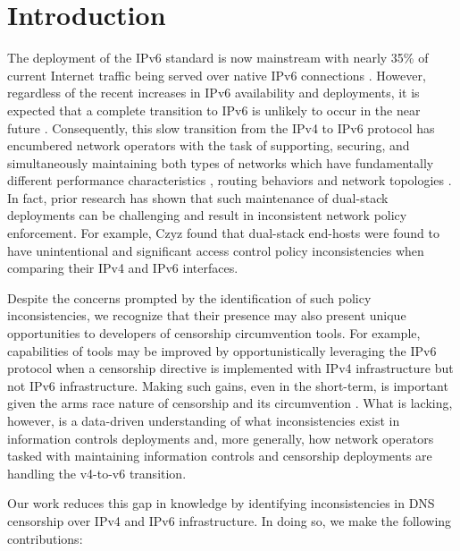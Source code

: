 \section{Introduction}\label{sec:intro}

The deployment of the IPv6 standard is now mainstream with nearly 35\% of
current Internet traffic being served over native IPv6 connections
\cite{Google-IPv6}. However, regardless of the recent increases in IPv6
availability and deployments, it is expected that a complete transition to IPv6
is unlikely to occur in the near future \cite{Prince-CF2021, Huston-APNIC2021}.
%
Consequently, this slow transition from the IPv4 to IPv6 protocol has
encumbered network operators with the task of supporting, securing, and
simultaneously maintaining both types of networks which have fundamentally
different performance characteristics \cite{perf}, routing behaviors and
network topologies \cite{topo}.
%
In fact, prior research has shown that such maintenance of dual-stack
deployments can be challenging and result in inconsistent network policy
enforcement.
%
For example, Czyz \etal \cite{Czyz-NDSS2016} found that dual-stack end-hosts
were found to have unintentional and significant access control policy
inconsistencies when comparing their IPv4 and IPv6 interfaces. 

Despite the concerns prompted by the identification of such policy
inconsistencies, we recognize that their presence may also present unique
opportunities to developers of censorship circumvention tools. For example,
capabilities of tools may be improved by opportunistically leveraging the IPv6
protocol when a censorship directive is implemented with IPv4 infrastructure
but not IPv6 infrastructure.
%
Making such gains, even in the short-term, is important given the arms race
nature of censorship and its circumvention \cite{reactive}.
%
What is lacking, however, is a data-driven understanding of what
inconsistencies exist in information controls deployments and, more generally,
how network operators tasked with maintaining information controls and
censorship deployments are handling the v4-to-v6 transition. 

Our work reduces this gap in knowledge by identifying inconsistencies in DNS
censorship over IPv4 and IPv6 infrastructure. In doing so, we make the
following contributions:

